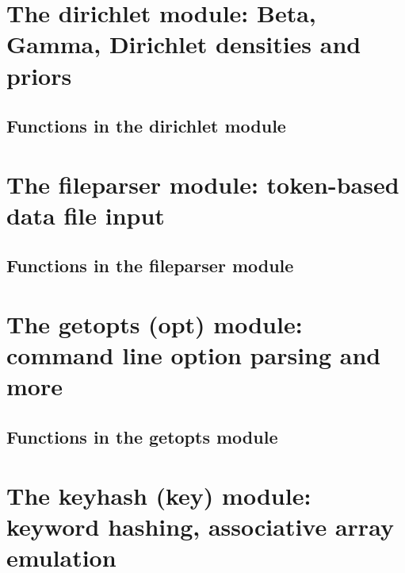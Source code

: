\documentclass[11pt]{book}
\begin{document}
%



\newpage
\section{The dirichlet module: Beta, Gamma, Dirichlet densities and priors}

\subsection{Functions in the dirichlet module}






\newpage
\section{The fileparser module: token-based data file input}

\subsection{Functions in the fileparser module}




\newpage
\section{The getopts (opt) module: command line option parsing and more}

\subsection{Functions in the getopts module}


\newpage
\section{The keyhash (key) module: keyword hashing, associative array emulation}

\end{document}
